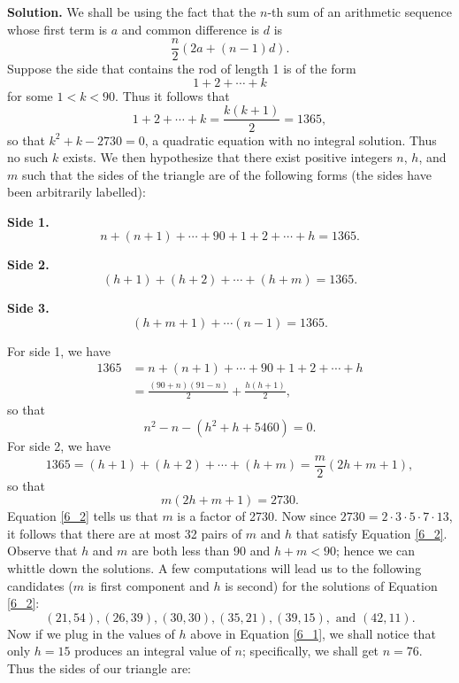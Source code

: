 \documentclass[9pt]{article}
\begin{document}
\begin{enumerate}
      \textbf{Solution.} We shall be using the fact that the $n$-th sum of an
      arithmetic sequence whose first term is $a$ and common difference is $d$
      is $$\frac{n}{2}(2a + (n-1)d).$$
      Suppose the side that contains the rod of length 1 is of the form
      $$1 + 2 + \cdots + k$$
      for some $1 < k < 90$. Thus it follows that
      $$1 + 2 + \cdots + k = \frac{k(k+1)}{2} = 1365,$$
      so that $k^2+k-2730=0$, a quadratic equation with no integral solution.
      Thus no such $k$ exists. We then hypothesize that there exist positive
      integers $n$, $h$, and $m$ such that the sides of the triangle are of the
      following forms (the sides have been arbitrarily labelled):
      
      \textbf{Side 1.}
      $$n + (n + 1) + \cdots + 90 + 1 + 2 + \cdots + h = 1365.$$
      
      \textbf{Side 2.}
      $$(h + 1) + (h + 2) + \cdots + (h + m) = 1365.$$
      
      \textbf{Side 3.}
      $$(h + m + 1) + \cdots (n - 1) = 1365.$$
      
      For side 1, we have
      \begin{align*}
         1365 &= n + (n + 1) + \cdots + 90 + 1 + 2 + \cdots + h \\
              &= \frac{(90 + n)(91 - n)}{2} + \frac{h(h+1)}{2},
      \end{align*}
      so that
      \begin{equation} \label{6_1}
         n^2 - n - (h^2+h+5460) = 0.
      \end{equation}
      For side 2, we have
      $$1365 = (h + 1) + (h + 2) + \cdots + (h + m) = \frac{m}{2}(2h+m+1),$$
      so that
      \begin{equation} \label{6_2}
         m(2h+m+1) = 2730.
      \end{equation}
      Equation \eqref{6_2} tells us that $m$ is a factor of 2730. Now since
      $2730 = 2 \cdot 3 \cdot 5 \cdot 7 \cdot 13$, it follows that there are
      at most 32 pairs of $m$ and $h$ that satisfy Equation \eqref{6_2}.
      Observe that $h$ and $m$ are both less than 90 and $h + m < 90$; hence we
      can whittle down the solutions. A few computations will lead us to the
      following candidates ($m$ is first component and $h$ is second) for the
      solutions of Equation  \eqref{6_2}:
      $$(21, 54), (26, 39), (30, 30), (35, 21), (39, 15), \text{ and }
        (42, 11).$$
      Now if we plug in the values of $h$ above in Equation \eqref{6_1}, we
      shall notice that only $h = 15$ produces an integral value of $n$;
      specifically, we shall get $n = 76$. Thus the sides of our triangle are:
      

\end{enumerate}
\end{document}
